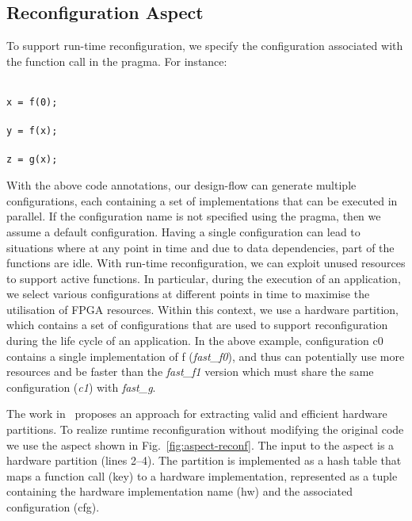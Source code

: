 \subsection{Reconfiguration Aspect}
\label{sect:asp_reconfig}
To support run-time reconfiguration, we specify the configuration associated with the function call in the \MAXC{} pragma. For instance:

\vspace{3mm}

\noindent\texttt{\footnotesize{\\
x = f(0); \\
\\
y = f(x); \\
\\
z = g(x); \\
}}

\noindent With the above code annotations, our design-flow can generate multiple configurations, each containing a set of \MAXC{} implementations that can be executed in parallel. If the configuration name is not specified using the \MAXC{} pragma, then we assume a default configuration. Having a single configuration can lead to situations where at any point in time and due to data dependencies, part of the functions are idle. With run-time reconfiguration, we can exploit unused resources to support active functions. In particular, during the execution of an application, we select various configurations at different points in time to maximise the utilisation of FPGA resources. Within this context, we use a hardware partition, which contains a set of configurations that are used to support reconfiguration during the life cycle of an application. In the above example, configuration c0 contains a single implementation of f (\emph{fast\_f0}), and thus can potentially use more resources and be faster than the \emph{fast\_f1} version which must share the same configuration (\emph{c1}) with \emph{fast\_g}.

The work in~\cite{Xinyu:Qiwei:Luk:Qiang:Pell:2012} proposes an
approach for extracting valid and efficient hardware partitions. To realize
runtime reconfiguration without modifying the original code we use the
aspect shown in Fig.~\ref{fig:aspect-reconf}.  The input to the
aspect is a hardware partition (lines 2--4). The partition is implemented as a
hash table that maps a function call (key) to a hardware
implementation, represented as a tuple containing the hardware
implementation name (hw) and the associated configuration (cfg).

